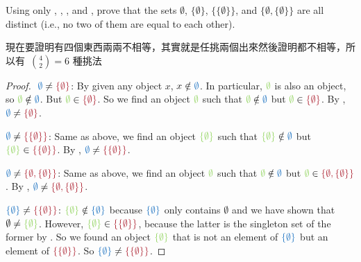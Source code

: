 \begin{exercise}\label{exercise 3.1.2}
Using only , , , and , prove that the sets \(\emptyset\), \( \{ \emptyset \} \), \( \{ \{ \emptyset \} \} \), and \( \{ \emptyset, \{ \emptyset \} \} \) are all distinct (i.e., no two of them are equal to each other).
\end{exercise}

\begin{note}
現在要證明有四個東西兩兩不相等，其實就是任挑兩個出來然後證明都不相等，所以有\ \(\binom{4}{2} = 6\) 種挑法
\end{note}

\begin{proof}$ $\newline
\(\BLUE{\emptyset} \neq \MAROON{\{\emptyset\}} \): By  given any object \(x\), \(x \notin \BLUE{\emptyset}\). In particular, \(\GREEN{\emptyset}\) is also an object, so \(\GREEN{\emptyset} \notin \BLUE{\emptyset}\). But \(\GREEN{\emptyset} \in \MAROON{\{\emptyset\}}\). So we find an object \(\GREEN{\emptyset}\) such that \(\GREEN{\emptyset} \notin \BLUE{\emptyset}\) but \(\GREEN{\emptyset} \in \MAROON{\{\emptyset\}}\). By , \(\BLUE{\emptyset} \neq \MAROON{\{\emptyset\}}\).

\(\BLUE{\emptyset} \neq \MAROON{\{ \{ \emptyset \} \}} \): Same as above, we find an object \(\GREEN{\{\emptyset\}}\) such that \(\GREEN{\{\emptyset\}} \notin \BLUE{\emptyset}\) but \(\GREEN{\{\emptyset\}} \in \MAROON{\{\{\emptyset\}\}}\). By , \(\BLUE{\emptyset} \neq \MAROON{\{\{\emptyset\}\}}\).

\(\BLUE{\emptyset} \neq \MAROON{ \{ \emptyset, \{ \emptyset \} \} } \): Same as above, we find an object \(\GREEN{\emptyset}\) such that \(\GREEN{\emptyset} \notin \BLUE{\emptyset}\) but \(\GREEN{\emptyset} \in \MAROON{\{ \emptyset, \{ \emptyset \} \}} \). By , \(\BLUE{\emptyset} \neq \MAROON{\{ \emptyset, \{ \emptyset \} \}}\).

\( \BLUE{\{ \emptyset \}} \neq \MAROON{\{ \{ \emptyset \} \}} \): \( \GREEN{\{ \emptyset \}} \notin \BLUE{\{ \emptyset \}} \) because \( \BLUE{\{ \emptyset \}} \) only contains \(\emptyset\) and we have shown that \(\emptyset \neq \GREEN{\{ \emptyset \}} \). However, \( \GREEN{\{ \emptyset \}} \in \MAROON{\{ \{ \emptyset \} \}} \), because the latter is the singleton set of the former by . So we found an object \(\GREEN{\{ \emptyset \}}\) that is not an element of \( \BLUE{\{\emptyset\}} \) but an element of \( \MAROON{\{\{ \emptyset \}\}} \). So \( \BLUE{\{ \emptyset \}} \neq \MAROON{\{ \{ \emptyset \} \}} \).


\end{proof}
